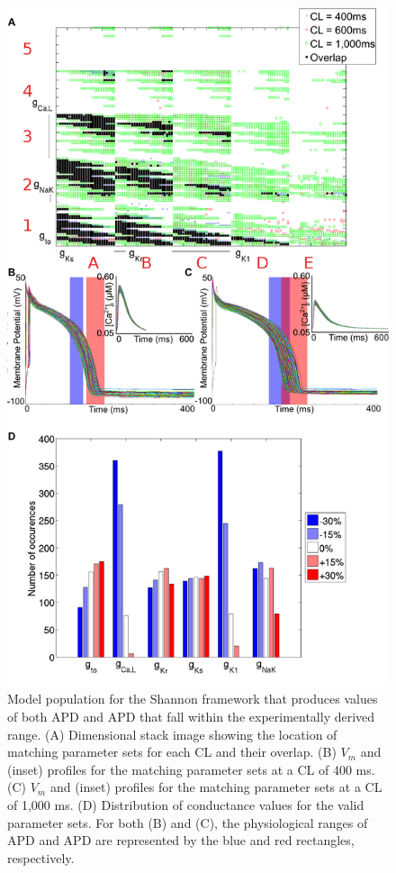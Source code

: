 \documentclass[../thesis-main.tex]{subfiles}
\begin{document}
\begin{figure}
 \centering
 \includegraphics[width=\textwidth]{shannon-population}
 \caption[Model population for the Shannon framework that produces values of both APD and APD that fall within the experimentally derived range.]{Model population for the Shannon framework that produces values of both APD and APD that fall within the experimentally derived range. (A) Dimensional stack image showing the location of matching parameter sets for each CL and their overlap. (B) $V_m$ and \cai{} (inset) profiles for the matching parameter sets at a CL of 400 ms. (C) $V_m$ and \cai{} (inset) profiles for the matching parameter sets at a CL of 1,000 ms. (D) Distribution of conductance values for the valid parameter sets. For both (B) and (C), the physiological ranges of APD and APD are represented by the blue and red rectangles, respectively.}
 \label{fig:shannon-population}
\end{figure}
\end{document}
